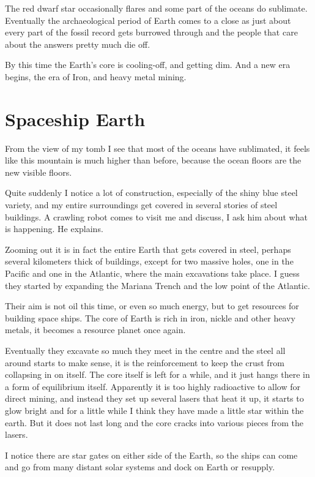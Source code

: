 The red dwarf star occasionally flares and some part of the oceans do sublimate.
Eventually the archaeological period of Earth comes to a close as just about
every part of the fossil record gets burrowed through and the people that care
about the answers pretty much die off. 

By this time the Earth's core is cooling-off, and getting dim. And a new era
begins, the era of Iron, and heavy metal mining. 

\section{Spaceship Earth} 

From the view of my tomb I see that most of the oceans have sublimated, it feels
like this mountain is much higher than before, because the ocean floors are the
new visible floors. 

Quite suddenly I notice a lot of construction, especially of the shiny blue steel
variety, and my entire surroundings get covered in several stories of steel
buildings. A crawling robot comes to visit me and discuss, I ask him about what
is happening. He explains. 

Zooming out it is in fact the entire Earth that gets covered in
steel, perhaps several kilometers thick of buildings, except for two massive 
holes, one in the Pacific and one in the Atlantic, where the main excavations 
take place. I guess they started by expanding the Mariana Trench and the low 
point of the Atlantic. 

Their aim is not oil this time, or even so much energy, but to get resources for
building space ships. The core of Earth is rich in iron, nickle and other heavy 
metals, it becomes a resource planet once again.

Eventually they excavate so much they meet in the centre and the steel all
around starts to make sense, it is the reinforcement to keep the crust from
collapsing in on itself. The core itself is left for a while, and it just hangs
there in a form of equilibrium itself.  Apparently it is too highly radioactive
to allow for direct mining, and instead they set up several lasers that heat it
up, it starts to glow bright and for a little while I think they have made a
little star within the earth.  But it does not last long and the core cracks
into various pieces from the lasers.  

I notice there are star gates on either side of the Earth, so the ships can come
and go from many distant solar systems and dock on Earth or resupply.

